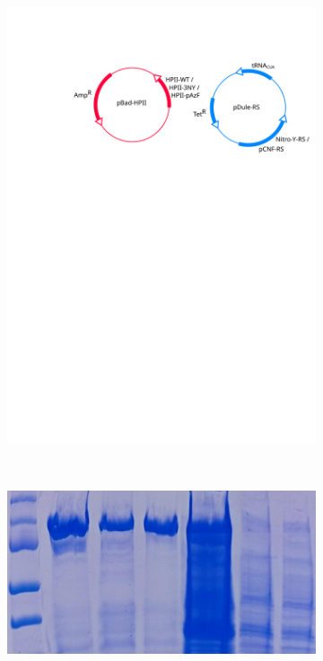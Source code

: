 \documentclass[journal=jacsat,manuscript=article]{achemso}
\begin{document}
\begin{figure}[h!]
\begin{subfigure}{0.49\textwidth}
  \end{subfigure}
  \begin{subfigure}{0.49\textwidth}
    \begin{minipage}{0.1\textwidth}\caption{}\end{minipage}%
    \begin{minipage}{0.9\textwidth}\includegraphics[width=0.9\linewidth]{figures/plasmid-diagram}\end{minipage}
  \end{subfigure}
  \\
  \vspace{2mm}
  \begin{subfigure}{\textwidth}
    \centering
    \begin{minipage}{0.1\textwidth}\caption{}\end{minipage}%
    \begin{minipage}{0.9\textwidth}\centering\includegraphics[width=0.7\linewidth]{figures/pure-gel}\end{minipage}

\end{subfigure}
\end{figure}
\end{document}
